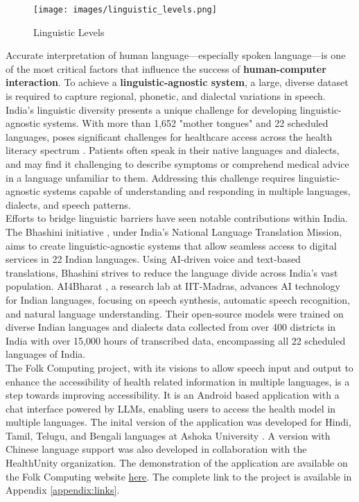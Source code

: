 \begin{figure}[H]
    \centering
    \texttt{[image: images/linguistic\_levels.png]}
    \caption{Linguistic Levels}
    \label{fig:linguistic_levels}
\end{figure}

\noindent Accurate interpretation of human language---especially spoken language---is one of the most critical factors that influence the success of \textcolor{TUMRed}{\textbf{human-computer interaction}}. To achieve a \textcolor{TUMRed}{\textbf{linguistic-agnostic system}}, a large, diverse dataset is required to capture regional, phonetic, and dialectal variations in speech.\\[\baselineskip]

\noindent India's linguistic diversity presents a unique challenge for developing linguistic-agnostic systems. With more than 1,652 "mother tongues" and 22 scheduled languages, poses significant challenges for healthcare access across the health literacy spectrum \cite{languagesIndia}. Patients often speak in their native languages and dialects, and may find it challenging to describe symptoms or comprehend medical advice in a language unfamiliar to them. Addressing this challenge requires linguistic-agnostic systems capable of understanding and responding in multiple languages, dialects, and speech patterns.\\[\baselineskip]

\noindent Efforts to bridge linguistic barriers have seen notable contributions within India. The Bhashini initiative \cite{bhashini}, under India's National Language Translation Mission, aims to create linguistic-agnostic systems that allow seamless access to digital services in 22 Indian languages. Using AI-driven voice and text-based translations, Bhashini strives to reduce the language divide across India's vast population. AI4Bharat \cite{ai4bharat}, a research lab at IIT-Madras, advances AI technology for Indian languages, focusing on speech synthesis, automatic speech recognition, and natural language understanding. Their open-source models were trained on diverse Indian languages and dialects data collected from over 400 districts in India with over 15,000 hours of transcribed data, encompassing all 22 scheduled languages of India.\\[\baselineskip]

\noindent The Folk Computing project, with its visions to allow speech input and output to enhance the accessibility of health related information in multiple languages, is a step towards improving accessibility. It is an Android based application with a chat interface powered by LLMs, enabling users to access the health model in multiple languages. The inital version of the application was developed for Hindi, Tamil, Telugu, and Bengali languages at Ashoka University \cite{folkcomp}. A version with Chinese language support was also developed in collaboration with the HealthUnity organization. The demonstration of the application are available on the Folk Computing website \href{https://kutumlab.github.io/folk-comp/#demos}{here}. The complete link to the project is available in Appendix \ref{appendix:links}.

